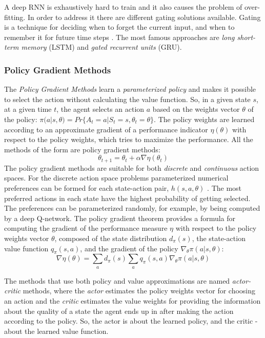 A deep RNN is exhaustively hard to train and it also causes the problem of over-fitting. In order to address it there are different gating solutions available. Gating is a technique for deciding when to forget the current input, and when to remember it for future time steps \cite{RNNvideo}. The most famous approaches are \textit{long short-term memory} (LSTM) and \textit{gated recurrent units} (GRU).

\subsubsection{Policy Gradient Methods} \label{PolicyGradMeths}
The \textit{Policy Gradient Methods} learn a \textit{parameterized policy} and makes it possible to select the action without calculating the value function. So, in a given state $s$, at a given time $t$, the agent selects an action $a$ based on the weights vector ${\theta}$ of the policy: ${\pi}(a|s,{\theta})=Pr\{A_{t}=a|S_{t}=s,{\theta}_{t}={\theta}\}$. The policy weights are learned according to an approximate gradient of a performance indicator ${\eta}({\theta})$ with respect to the policy weights, which tries to maximize the performance. All the methods of the form  are policy gradient methods:
\begin{equation}\label{gradM}
\theta_{t+1}=\theta_{t}+\alpha \nabla \eta (\theta_{t})
\end{equation}
The policy gradient methods are suitable for both \textit{discrete} and \textit{continuous} action spaces. For the discrete action space problems parameterized numerical preferences can be formed for each state-action pair, $h(s,a,\theta)$ \cite{Sutton}. The most preferred actions in each state have the highest probability of getting selected. The preferences can be parameterized randomly, for example, by being computed by a deep Q-network. The policy gradient theorem provides a formula for computing the gradient of the performance measure $\eta$ with respect to the policy weights vector $\theta$, composed of the state distribution $d_{\pi}(s)$, the state-action value function $q_{\pi}(s,a)$, and the gradient of the policy $\nabla_{\theta}\pi(a|s,\theta)$:
\begin{equation}\label{gradMTheorem}
\nabla\eta(\theta)=\sum_{a}d_{\pi}(s)\sum_{a}q_{\pi}(s,a)\nabla_{\theta}\pi(a|s,\theta)
\end{equation}

The methods that use both policy and value approximations are named \textit{actor-critic} methods, where the \textit{actor} estimates the policy weights vector for choosing an action and the \textit{critic} estimates the value weights for providing the information about the quality of a state the agent ends up in after making the action according to the policy. So, the actor is about the learned policy, and the critic - about the learned value function. 

